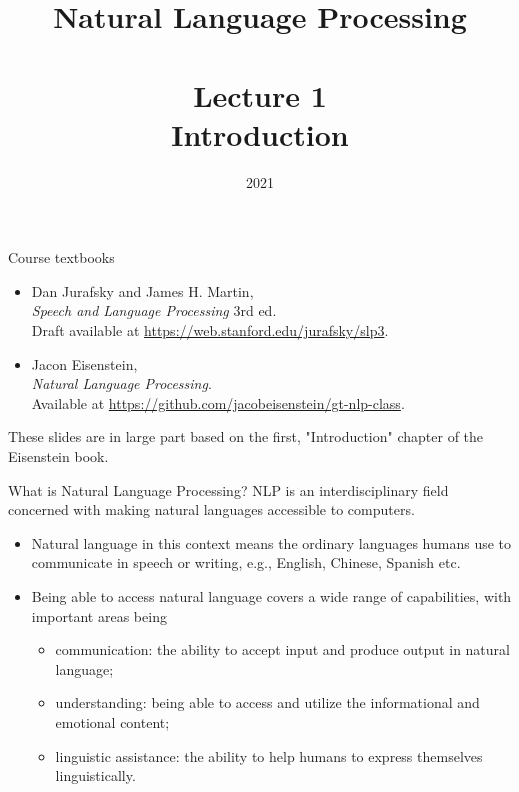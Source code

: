 \documentclass[style=upen, size=14pt]{powerdot}
\newcommand{\gold}{\color{arany}}
\begin{document}
\title{Natural Language Processing\\~~\\Lecture 1\\Introduction}

\date{2021}
\maketitle

\begin{slide}{Course textbooks}
  \pause
  \begin{itemize}
  \item  Dan Jurafsky and James H. Martin,\\
    \emph{Speech and Language Processing} 3rd ed.\\
    Draft available at \href{https://web.stanford.edu/~jurafsky/slp3}{https://web.stanford.edu/jurafsky/slp3}.\pause
  \item Jacon Eisenstein,\\
    \emph{Natural Language Processing}.\\
    Available at
    \href{https://github.com/jacobeisenstein/gt-nlp-class}{https://github.com/jacobeisenstein/gt-nlp-class}.
  \end{itemize}\pause
  These slides are in large part based on the first, "Introduction" chapter of
  the Eisenstein book.
\end{slide}

\begin{slide}[toc=What is NLP?]{What is Natural Language Processing?}
  {\gold NLP} is an interdisciplinary field concerned with making natural
  languages accessible to computers.\pause
  \begin{itemize}
  \item {\gold Natural language} in this context means the ordinary
    languages humans use to communicate in speech or writing, e.g., English,
    Chinese, Spanish etc.\pause
  \item Being able to {\gold access} natural language covers a wide range
    of capabilities, with important areas being\pause
    \begin{itemize}
    \item {\gold communication}: the ability to accept input and produce
      output in natural language;\pause
    \item {\gold understanding}: being able to access and utilize the
      informational and emotional content;\pause
    \item {\gold linguistic assistance}: the ability to help humans to
      express themselves linguistically.
    \end{itemize}
  \end{itemize}
\end{slide}
\end{document}
